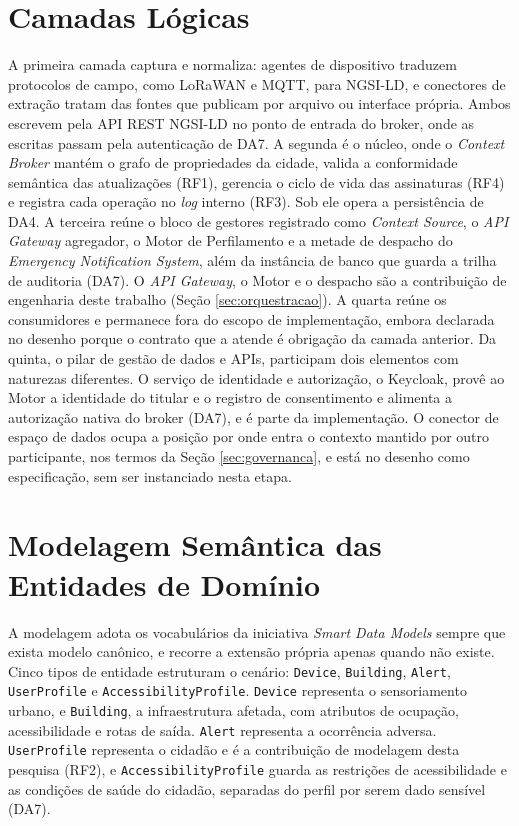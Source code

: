 \section{Camadas Lógicas}
\label{sec:camadas}

A primeira camada captura e normaliza: agentes de dispositivo traduzem protocolos de campo, como LoRaWAN e MQTT, para NGSI-LD, e conectores de extração tratam das fontes que publicam por arquivo ou interface própria. Ambos escrevem pela API REST NGSI-LD no ponto de entrada do broker, onde as escritas passam pela autenticação de DA7. A segunda é o núcleo, onde o \textit{Context Broker} mantém o grafo de propriedades da cidade, valida a conformidade semântica das atualizações (RF1), gerencia o ciclo de vida das assinaturas (RF4) e registra cada operação no \textit{log} interno (RF3). Sob ele opera a persistência de DA4. A terceira reúne o bloco de gestores registrado como \textit{Context Source}, o \textit{API Gateway} agregador, o Motor de Perfilamento e a metade de despacho do \textit{Emergency Notification System}, além da instância de banco que guarda a trilha de auditoria (DA7). O \textit{API Gateway}, o Motor e o despacho são a contribuição de engenharia deste trabalho (Seção \ref{sec:orquestracao}). A quarta reúne os consumidores e permanece fora do escopo de implementação, embora declarada no desenho porque o contrato que a atende é obrigação da camada anterior. Da quinta, o pilar de gestão de dados e APIs, participam dois elementos com naturezas diferentes. O serviço de identidade e autorização, o Keycloak, provê ao Motor a identidade do titular e o registro de consentimento e alimenta a autorização nativa do broker (DA7), e é parte da implementação. O conector de espaço de dados ocupa a posição por onde entra o contexto mantido por outro participante, nos termos da Seção \ref{sec:governanca}, e está no desenho como especificação, sem ser instanciado nesta etapa.

\section{Modelagem Semântica das Entidades de Domínio}
\label{sec:modelagem}

A modelagem adota os vocabulários da iniciativa \textit{Smart Data Models} \cite{smartdatamodels2025} sempre que exista modelo canônico, e recorre a extensão própria apenas quando não existe. Cinco tipos de entidade estruturam o cenário: \texttt{Device}, \texttt{Building}, \texttt{Alert}, \texttt{UserProfile} e \texttt{AccessibilityProfile}. \texttt{Device} representa o sensoriamento urbano, e \texttt{Building}, a infraestrutura afetada, com atributos de ocupação, acessibilidade e rotas de saída. \texttt{Alert} representa a ocorrência adversa. \texttt{UserProfile} representa o cidadão e é a contribuição de modelagem desta pesquisa (RF2), e \texttt{AccessibilityProfile} guarda as restrições de acessibilidade e as condições de saúde do cidadão, separadas do perfil por serem dado sensível (DA7).

